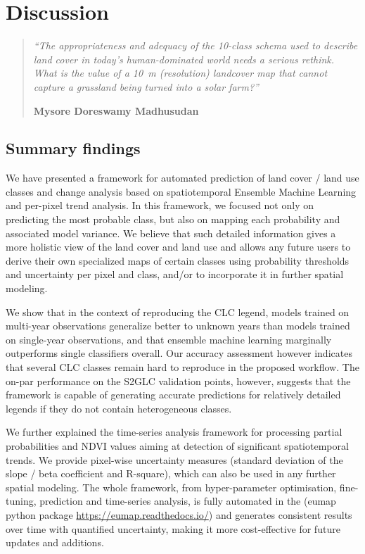 \section{Discussion}


\begin{quote}
\emph{``The appropriateness and adequacy of the 10-class schema used to describe land cover in today's human-dominated world needs a serious rethink. What is the value of a 10~m (resolution) landcover map that cannot capture a grassland being turned into a solar farm?''}\par
\textbf{Mysore Doreswamy Madhusudan}
\end{quote}

\subsection*{Summary findings}
    
We have presented a framework for automated prediction of land cover / land use classes and change analysis based on spatiotemporal Ensemble Machine Learning and per-pixel trend analysis. In this framework, we focused not only on predicting the most probable class, but also on mapping each probability and associated model variance. We believe that such detailed information gives a more holistic view of the land cover and land use and allows any future users to derive their own specialized maps of certain classes using probability thresholds and uncertainty per pixel and class, and/or to incorporate it in further spatial modeling. 

We show that in the context of reproducing the CLC legend, models trained on multi-year observations generalize better to unknown years than models trained on single-year observations, and that ensemble machine learning marginally outperforms single classifiers overall. Our accuracy assessment however indicates that several CLC classes remain hard to reproduce in the proposed workflow. The on-par performance on the S2GLC validation points, however, suggests that the framework is capable of generating accurate predictions for relatively detailed legends if they do not contain heterogeneous classes.
    
We further explained the time-series analysis framework for processing partial probabilities and NDVI values aiming at detection of significant spatiotemporal trends. We provide pixel-wise uncertainty measures (standard deviation of the slope / beta coefficient and R-square), which can also be used in any further spatial modeling. The whole framework, from hyper-parameter optimisation, fine-tuning, prediction and time-series analysis, is fully automated in the (\textsf{eumap} python package \url{https://eumap.readthedocs.io/}) and generates consistent results over time with quantified uncertainty, making it more cost-effective for future updates and additions.

